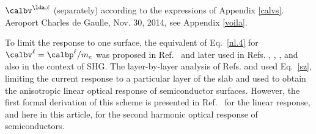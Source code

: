 \documentclass[floatfix,prb,aps,superscriptaddress,11pt,preprint,letterpaper]{revtex4}
\begin{document}
$\calbv^{\lda,\ell}$ (separately)
according to the expressions of
Appendix \ref{calvs}. {\color{red}Aeroport Charles de Gaulle, Nov. 30,
2014, see Appendix \ref{voila}}.

To limit the response to one surface, the equivalent of Eq.~\eqref{nl.4} 
for $\calbv^\ell=\calbp^\ell/m_e$ was proposed in 
Ref.~ and later used in Refs.
,
,
,
 and  
also in the context of SHG. 
The layer-by-layer analysis of Refs.  
and  used Eq.~\eqref{sz}, 
limiting the current response
to a particular layer of the slab and used to obtain the
anisotropic linear optical response of semiconductor surfaces.
However, the first formal derivation of this scheme is presented in
Ref.~ for the linear response, and here in this 
article, for the second harmonic optical response of semiconductors.
\end{document}
